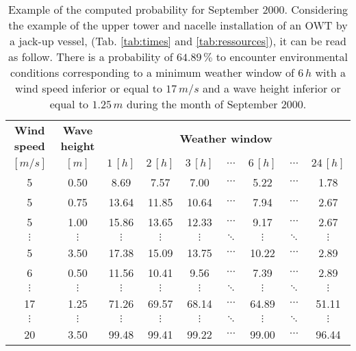 \begin{table}
\label{tab:proba}
\begin{tabular}{ccccccccc}
\hline
{\bf Wind speed} & {\bf Wave height} & \multicolumn{ 7}{c}{{\bf Weather window}} \\
$[m/s]$      &      $[m]$      &          $1\, [h]$ &          $2\, [h]$ &          $3\, [h]$ &  $\cdots$ & $6\, [h]$  & $\cdots$ &        $24\, [h]$ \\
\hline
5 &       0.50 &       8.69 &       7.57 &       7.00 &  $\cdots$ & 5.22 & $\cdots$ &      1.78 \\
5 &       0.75 &      13.64 &      11.85 &      10.64 &  $\cdots$ & 7.94 & $\cdots$ &      2.67 \\
5 &       1.00 &      15.86 &      13.65 &      12.33 &  $\cdots$ & 9.17 & $\cdots$ &      2.67 \\
 $\vdots$ &  $\vdots$ &  $\vdots$ &  $\vdots$ &  $\vdots$ &  $\ddots$ & $\vdots$ & $\ddots$ &  $\vdots$ \\
5 &       3.50 &      17.38 &      15.09 &      13.75 &  $\cdots$ & 10.22 & $\cdots$ &       2.89 \\
6 &       0.50 &      11.56 &      10.41 &       9.56 &  $\cdots$ & 7.39 & $\cdots$ &      2.89 \\
$\vdots$ &  $\vdots$ &  $\vdots$ &  $\vdots$ &  $\vdots$ & $\ddots$ & $\vdots$ &        $\ddots$ &  $\vdots$ \\
17 & 1.25 & 71.26 & 69.57 & 68.14 & $\cdots$ & 64.89 & $\cdots$ & 51.11 \\
$\vdots$ &  $\vdots$ &  $\vdots$ &  $\vdots$ &  $\vdots$ & $\ddots$ & $\vdots$ &        $\ddots$ &  $\vdots$ \\
20 &       3.50 &      99.48 &      99.41 &      99.22 &  $\cdots$ & 99.00 & $\cdots$ &      96.44 \\
\hline
\end{tabular}  

\caption{Example of the computed probability for September 2000. Considering the example of the upper tower and nacelle installation of an OWT by a jack-up vessel, (Tab. \ref{tab:times} and \ref{tab:ressources}), it can be read as follow. There is a probability of $64.89\, \%$ to encounter environmental conditions corresponding to a minimum weather window of $6\, h$ with a wind speed inferior or equal to $17\, m/s$ and a wave height inferior or equal to $1.25\, m$ during the month of September 2000.}

\end{table}